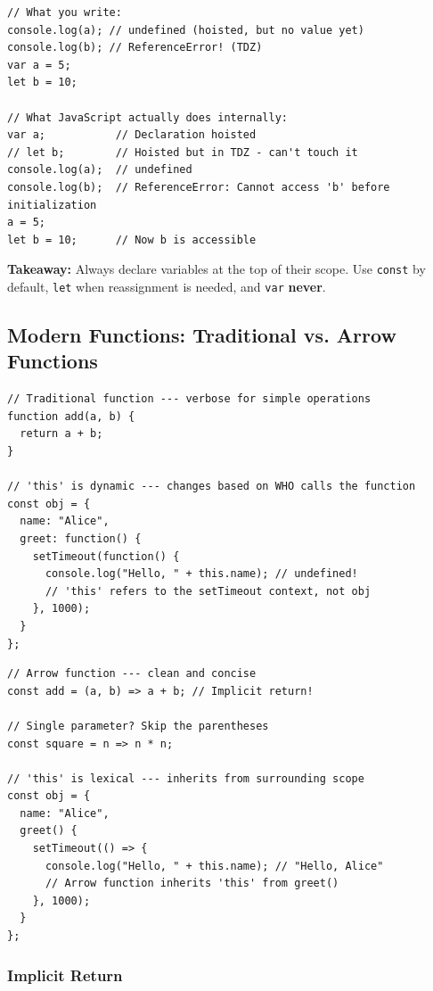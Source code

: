 \documentclass[12pt]{article}
\begin{document}
\begin{lstlisting}
// What you write:
console.log(a); // undefined (hoisted, but no value yet)
console.log(b); // ReferenceError! (TDZ)
var a = 5;
let b = 10;

// What JavaScript actually does internally:
var a;           // Declaration hoisted
// let b;        // Hoisted but in TDZ - can't touch it
console.log(a);  // undefined
console.log(b);  // ReferenceError: Cannot access 'b' before initialization
a = 5;
let b = 10;      // Now b is accessible
\end{lstlisting}

\textbf{Takeaway:} Always declare variables at the top of their scope. Use \texttt{const} by default, \texttt{let} when reassignment is needed, and \texttt{var} \textbf{never}.

\subsection{Modern Functions: Traditional vs. Arrow Functions}

\begin{badway}
\begin{lstlisting}
// Traditional function --- verbose for simple operations
function add(a, b) {
  return a + b;
}

// 'this' is dynamic --- changes based on WHO calls the function
const obj = {
  name: "Alice",
  greet: function() {
    setTimeout(function() {
      console.log("Hello, " + this.name); // undefined!
      // 'this' refers to the setTimeout context, not obj
    }, 1000);
  }
};
\end{lstlisting}
\end{badway}

\begin{proway}
\begin{lstlisting}
// Arrow function --- clean and concise
const add = (a, b) => a + b; // Implicit return!

// Single parameter? Skip the parentheses
const square = n => n * n;

// 'this' is lexical --- inherits from surrounding scope
const obj = {
  name: "Alice",
  greet() {
    setTimeout(() => {
      console.log("Hello, " + this.name); // "Hello, Alice"
      // Arrow function inherits 'this' from greet()
    }, 1000);
  }
};
\end{lstlisting}
\end{proway}

\subsubsection*{Implicit Return}
\end{document}
